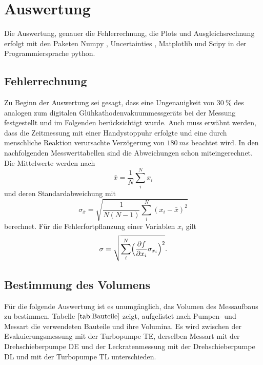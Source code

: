 \section{Auswertung}
Die Auswertung, genauer die Fehlerrechnung, die Plots und Ausgleichsrechnung erfolgt mit den Paketen
Numpy \cite{numpy}, Uncertainties \cite{uncertainties}, Matplotlib \cite{matplotlib} und Scipy \cite{scipy} in der Programmiersprache python.
\subsection{Fehlerrechnung}
Zu Beginn der Auswertung sei gesagt, dass eine Ungenauigkeit von $\SI{30}{\percent}$ des analogen zum digitalen Glühkathodenvakuummessgeräts
bei der Messung festgestellt und im Folgenden berücksichtigt wurde.
Auch muss erwähnt werden, dass die Zeitmessung mit einer Handystoppuhr erfolgte und eine durch menschliche Reaktion verursachte
Verzögerung von $\SI{180}{ms}$ beachtet wird.\cite{reaktion}
In den nachfolgenden Messwerttabellen sind die Abweichungen schon miteingerechnet.\\
Die Mittelwerte werden nach
\begin{equation}
	\bar{x}=\frac{1}{N}\sum_{i}^N x_i
\end{equation}
und deren Standardabweichung mit
\begin{equation}
	\sigma_{\bar{x}} = \sqrt{\frac{1}{N(N-1)} \sum_{i}^N (x_i-\bar{x})^2}
\end{equation}
berechnet.
Für die Fehlerfortpflanzung einer Variablen $x_i$ gilt
\begin{equation}
	\sigma = \sqrt{\sum_{i}^N \Bigl(\frac{\partial f}{\partial x_i} \sigma_{x_i}\Bigr)^2}.
	\label{eq:gaussfehler}
\end{equation}
\subsection{Bestimmung des Volumens}
Für die folgende Auswertung ist es unumgänglich, das Volumen des Messaufbaus zu bestimmen.
Tabelle $\ref{tab:Bauteile}$ zeigt, aufgelistet nach Pumpen- und Messart die verwendeten Bauteile und ihre Volumina.
Es wird zwischen der Evakuierungsmessung mit der Turbopumpe TE, derselben Messart mit der Drehschieberpumpe DE und der Leckratenmessung
mit der Drehschieberpumpe DL und mit der Turbopumpe TL unterschieden.\newline

